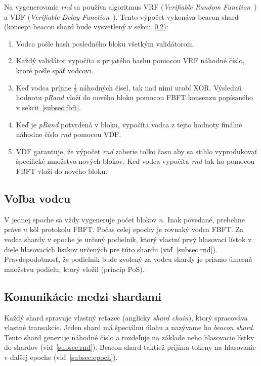Na vygenerovanie \textit{rnd} sa používa algoritmus VRF (\textit{Verifiable Random Function~\cite{algorandGilad}}) a VDF (\textit{Verifiable Delay Function~\cite{vdfBoneh}}). Tento výpočet vykonáva beacon shard (koncept beacon shard bude vysvetlený v sekcii~\ref{subsec:cross-com}):
\begin{enumerate}
	\item Vodca pošle hash posledného bloku všetkým validátorom.
	\item Každý validátor vypočíta s prijatého hashu pomocou VRF náhodné číslo, ktoré pošle späť vodcovi.
	\item Keď vodca príjme $\frac{1}{3}$ náhodných čísel, tak nad nimi urobí XOR. Výslednú hodnotu \textit{pRand} vloží do nového bloku pomocou FBFT konsenzu popísaného v sekcii~\ref{subsec:fbft}.
	\item Keď je \textit{pRand} potvrdená v bloku, vypočíta vodca z tejto hodnoty finálne náhodne číslo \textit{rnd} pomocou VDF.
	\item VDF garantuje, že výpočet \textit{rnd} zaberie toľko času aby sa stihlo vyprodukovať špecifické množstvo nových blokov. Keď vodca vypočíta \textit{rnd} tak ho pomocou FBFT vloží do nového bloku.
\end{enumerate}

\subsection{Voľba vodcu}
V jednej epoche sa vždy vygeneruje počet blokov $n$. Inak povedané, prebehne práve $n$ kôl protokolu FBFT. Počas celej epochy je rovnaký vodca FBFT. Za vodca shardy v epoche je určený podielnik, ktorý vlastní prvý hlasovací lístok v diele hlasovacích lístkov určených pre túto shardu (viď~\ref{subsec:rnd}). Pravdepodobnosť, že podielnik bude zvolený za vodcu shardy je priamo úmerná množstvu podielu, ktorý vložil (princíp PoS).

\subsection{Komunikácie medzi shardami}\label{subsec:cross-com}
Každý shard spravuje vlastný reťazec (anglicky \textit{shard chain}), ktorý spracováva vlastné transakcie. Jeden shard má špeciálnu úlohu a nazývame ho \textit{beacon shard}. Tento shard generuje náhodné číslo a rozdeľuje na základe neho hlasovacie lístky do shardov (viď~\ref{subsec:rnd}). Beacon shard taktiež prijíma tokeny na hlasovanie v ďalšej epoche (viď~\ref{subsec:epoch}).

